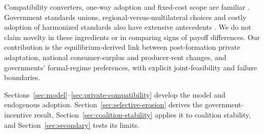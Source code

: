 Compatibility converters, one-way adoption and fixed-cost scope are familiar \citep{farrellSaloner1992,doganogluWright2006,buccellaEtAl2023}. Government standards unions, regional-versus-multilateral choices and costly adoption of harmonized standards also have extensive antecedents \citep{gandalShy2001,takaradaEtAl2020,kawabataTakarada2021,schmidtSteingress2022,maggiMrazova2024}. We do not claim novelty in these ingredients or in comparing signs of payoff differences. Our contribution is the equilibrium-derived link between post-formation private adaptation, national consumer-surplus and producer-rent changes, and governments' formal-regime preferences, with explicit joint-feasibility and failure boundaries.

Sections~\ref{sec:model}--\ref{sec:private-compatibility} develop the model and endogenous adoption. Section~\ref{sec:selective-erosion} derives the government-incentive result, Section~\ref{sec:coalition-stability} applies it to coalition stability, and Section~\ref{sec:secondary} tests its limits.
